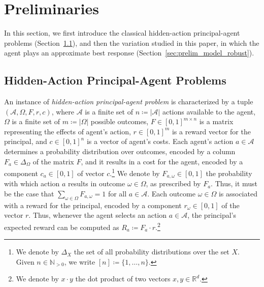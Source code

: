 \section{Preliminaries}\label{sec:preliminaries}

In this section, we first introduce the classical hidden-action principal-agent problems (Section~\ref{sec:prelim_model_classical}), and then the variation studied in this paper, in which the agent plays an approximate best response (Section~\ref{sec:prelim_model_robust}).




\subsection{Hidden-Action Principal-Agent Problems}\label{sec:prelim_model_classical}

An instance of \emph{hidden-action principal-agent problem} is characterized by a tuple $\left(\mathcal{A},\Omega,F,r,c\right)$, where $\mathcal{A}$ is a finite set of $n \coloneqq |\mathcal{A}|$ actions available to the agent, $\Omega$ is a finite set of $m \coloneqq |\Omega|$ possible outcomes, $F \in [0,1]^{m \times n}$ is a matrix representing the effects of agent's action, $r \in [0,1]^m$ is a reward vector for the principal, and $c \in [0,1]^n$ is a vector of agent's costs.
%
Each agent's action $a \in \mathcal{A}$ determines a probability distribution over outcomes, encoded by a column $F_a \in \Delta_{\Omega}$ of the matrix $F$, and it results in a cost for the agent, encoded by a component $ c_a \in [0, 1]$ of vector $c$.\footnote{We denote by $\Delta_X$ the set of all probability distributions over the set $X$.
	Given $n \in \mathbb{N}_{>0}$, we write $[n]\coloneqq \{1,\dots, n\}$.}
%
%
We denote by $F_{a,\omega} \in [0,1]$ the probability with which action $a$ results in outcome $\omega \in \Omega$, as prescribed by $F_a$.
%
Thus, it must be the case that $\sum_{\omega \in \Omega}F_{a,\omega}=1$ for all $a \in \mathcal{A}$.
%
Each outcome $\omega \in \Omega$ is associated with a reward for the principal, encoded by a component $r_\omega \in [0,1]$ of the vector $r$.
%
Thus, whenever the agent selects an action $a \in \mathcal{A}$, the principal's expected
reward can be computed as $R_a\coloneqq F_{a}\cdot r$.\footnote{We denote by 
	$x\cdot y$ the dot product of two vectors $x,y \in \mathbb{R}^d$.}

